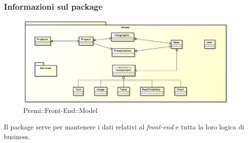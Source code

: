 	\subsubsection*{Informazioni sul package}
		\begin{figure}[h]
			\centering
			\includegraphics[width=0.7\linewidth]{img/front-end-package_model}
			\caption[Premi::Front-End::Model]{Premi::Front-End::Model}
		\end{figure}
		Il package serve per mantenere i dati relativi al \textit{front-end} e tutta la loro logica di business.

